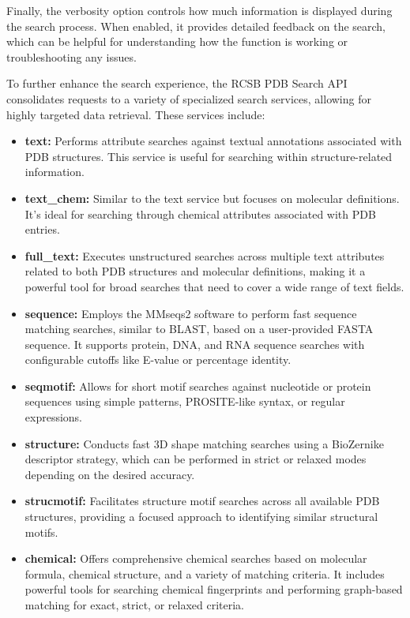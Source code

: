 Finally, the verbosity option controls how much information is displayed during the search process. When enabled, it provides detailed feedback on the search, which can be helpful for understanding how the function is working or troubleshooting any issues.

To further enhance the search experience, the RCSB PDB Search API consolidates requests to a variety of specialized search services, allowing for highly targeted data retrieval. These services include:

\begin{itemize}
\item
  \textbf{text:} Performs attribute searches against textual annotations associated with PDB structures. This service is useful for searching within structure-related information.
\item
  \textbf{text\_chem:} Similar to the text service but focuses on molecular definitions. It's ideal for searching through chemical attributes associated with PDB entries.
\item
  \textbf{full\_text:} Executes unstructured searches across multiple text attributes related to both PDB structures and molecular definitions, making it a powerful tool for broad searches that need to cover a wide range of text fields.
\item
  \textbf{sequence:} Employs the MMseqs2 software to perform fast sequence matching searches, similar to BLAST, based on a user-provided FASTA sequence. It supports protein, DNA, and RNA sequence searches with configurable cutoffs like E-value or percentage identity.
\item
  \textbf{seqmotif:} Allows for short motif searches against nucleotide or protein sequences using simple patterns, PROSITE-like syntax, or regular expressions.
\item
  \textbf{structure:} Conducts fast 3D shape matching searches using a BioZernike descriptor strategy, which can be performed in strict or relaxed modes depending on the desired accuracy.
\item
  \textbf{strucmotif:} Facilitates structure motif searches across all available PDB structures, providing a focused approach to identifying similar structural motifs.
\item
  \textbf{chemical:} Offers comprehensive chemical searches based on molecular formula, chemical structure, and a variety of matching criteria. It includes powerful tools for searching chemical fingerprints and performing graph-based matching for exact, strict, or relaxed criteria.
\end{itemize}

